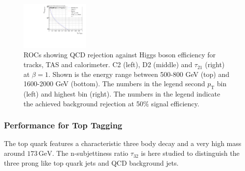 \begin{figure}[htp]
\includegraphics[width=0.3\textwidth]{sascha_input/plots/Higgs/ROC/Beta1/ROC_ALL_h_recoJet_nSub21_bin5.pdf}
\caption{\footnotesize{ROCs showing QCD rejection against Higgs boson efficiency for tracks, TAS and calorimeter. C2 (left), D2 (middle) and $\tau_{21}$ (right) at $\beta=1$. Shown is the energy range between 500-800 GeV (top) and 1600-2000 GeV (bottom). The numbers in the legend second $p_{\mathrm{T}}$ bin (left) and highest bin (right). The numbers in the legend indicate the achieved background rejection at 50\% signal efficiency.}}\label{fig:ROC_higgs_nSub21}
\end{figure}

\subsubsection{Performance for Top Tagging}
The top quark features a characteristic three body decay and a very high mass around $173 \, \text{GeV}$. The n-subjettiness ratio $\tau_{32}$ is here studied to distinguish the three prong like top quark jets and QCD background jets.

